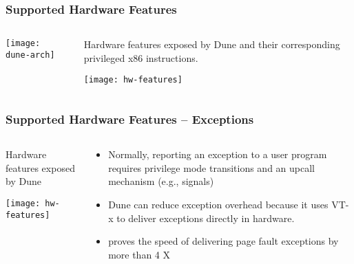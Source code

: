 \begin{frame}[plain]
	\frametitle{Supported Hardware Features}
	
	
	
	\begin{columns}
		
		\begin{column}{.4\textwidth}
	
			
			\texttt{[image: dune-arch]}
			
		\end{column}
		
		\begin{column}{.6\textwidth}
			\centering
			Hardware features exposed by Dune and their corresponding privileged x86 instructions.

			\texttt{[image: hw-features]}					
			
		\end{column}
		
		
	\end{columns}
	
	
\end{frame}


\begin{frame}[plain]
	\frametitle{Supported Hardware Features -- Exceptions}
	
	
	
	\begin{columns}
		
		\begin{column}{.4\textwidth}
			\centering
			Hardware features exposed by Dune
			
			\texttt{[image: hw-features]}
			
		\end{column}
		
		\begin{column}{.6\textwidth}


		\begin{itemize}
	\item Normally, reporting an exception to a
	user program requires privilege mode transitions and an
	upcall mechanism (e.g., signals)
	\item Dune can reduce exception overhead because it uses VT-x to deliver exceptions directly in hardware.
	\item proves the speed of delivering page fault exceptions by more than 4 X
		\end{itemize}					
			
		\end{column}
		
		
	\end{columns}
	
	
\end{frame}


